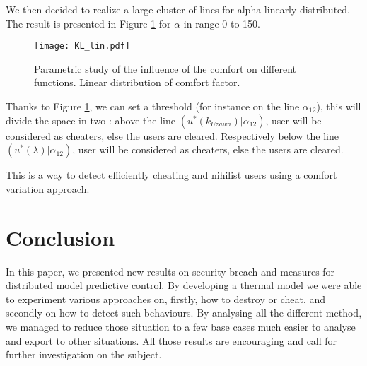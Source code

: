 \documentclass[conference, peerreview]{IEEEtran}
\begin{document}
We then decided to realize a large cluster of lines for alpha linearly distributed. The result is presented in Figure \ref{CM_3} for $\alpha$ in range 0 to 150. 

\begin{figure}[!t]
\centering
\texttt{[image: KL\_lin.pdf]}
\caption{Parametric study of the influence of the comfort on different functions. Linear distribution of comfort factor.}
\label{CM_3}
\end{figure}

Thanks to Figure \ref{CM_3}, we can set a threshold (for instance on the line $\alpha_{12}$), this will divide the space in two : above the line $(u^*(k_{Uzawa}) | \alpha_{12})$, user will be considered as cheaters, else the users are cleared. Respectively below the line $(u^*(\lambda) | \alpha_{12})$, user will be considered as cheaters, else the users are cleared.

This is a way to detect efficiently cheating and nihilist users using a comfort variation approach.  


\section{Conclusion}
In this paper, we presented new results on security breach and measures for distributed model predictive control. By developing a thermal model we were able to experiment various approaches on,  firstly,  how to destroy or cheat, and secondly on how to detect such behaviours. By analysing all  the different method, we managed to reduce those situation to a few base cases much easier to analyse and export to other situations. All those results are encouraging and call for further investigation on the subject. 



\end{document}
